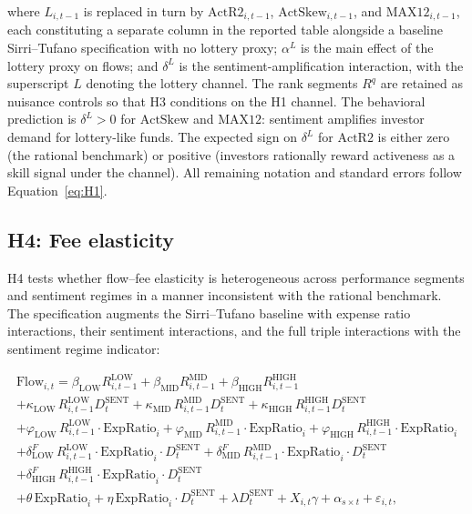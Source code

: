 \documentclass[12pt, oneside]{report}
\let\phi\varphi
\begin{document}
\noindent where $L_{i,t-1}$ is replaced in turn by
$\text{ActR2}_{i,t-1}$, $\text{ActSkew}_{i,t-1}$, and
$\text{MAX12}_{i,t-1}$, each constituting a separate column in the
reported table alongside a baseline Sirri--Tufano specification with
no lottery proxy; $\alpha^L$ is the main effect of the lottery proxy
on flows; and $\delta^L$ is the sentiment-amplification interaction,
with the superscript $L$ denoting the lottery channel. The rank
segments $R^q$ are retained as nuisance controls so that H3
conditions on the H1 channel. The behavioral prediction is
$\delta^L > 0$ for $\text{ActSkew}$ and $\text{MAX12}$: sentiment
amplifies investor demand for lottery-like funds. The expected sign
on $\delta^L$ for $\text{ActR2}$ is either zero (the rational
benchmark) or positive (investors rationally reward activeness as a
skill signal under the \textcite{AmihudGoyenko2013} channel). All
remaining notation and standard errors follow Equation~\ref{eq:H1}.

\subsection{H4: Fee elasticity}
\label{sec:H4_method}

\noindent H4 tests whether flow--fee elasticity is heterogeneous across
performance segments and sentiment regimes in a manner inconsistent
with the rational benchmark. The specification augments the
Sirri--Tufano baseline with expense ratio interactions, their
sentiment interactions, and the full triple interactions with the
sentiment regime indicator:

\begin{multline}
\text{Flow}_{i,t} =
  \beta_{\text{LOW}} R^{\text{LOW}}_{i,t-1}
+ \beta_{\text{MID}} R^{\text{MID}}_{i,t-1}
+ \beta_{\text{HIGH}} R^{\text{HIGH}}_{i,t-1} \\
+ \kappa_{\text{LOW}}\, R^{\text{LOW}}_{i,t-1} D^{\text{SENT}}_t
+ \kappa_{\text{MID}}\, R^{\text{MID}}_{i,t-1} D^{\text{SENT}}_t
+ \kappa_{\text{HIGH}}\, R^{\text{HIGH}}_{i,t-1} D^{\text{SENT}}_t \\
+ \phi_{\text{LOW}}\, R^{\text{LOW}}_{i,t-1} \cdot \text{ExpRatio}_i
+ \phi_{\text{MID}}\, R^{\text{MID}}_{i,t-1} \cdot \text{ExpRatio}_i
+ \phi_{\text{HIGH}}\, R^{\text{HIGH}}_{i,t-1} \cdot \text{ExpRatio}_i \\
+ \delta^F_{\text{LOW}}\, R^{\text{LOW}}_{i,t-1} \cdot \text{ExpRatio}_i \cdot D^{\text{SENT}}_t
+ \delta^F_{\text{MID}}\, R^{\text{MID}}_{i,t-1} \cdot \text{ExpRatio}_i \cdot D^{\text{SENT}}_t \\
+ \delta^F_{\text{HIGH}}\, R^{\text{HIGH}}_{i,t-1} \cdot \text{ExpRatio}_i \cdot D^{\text{SENT}}_t \\
+ \theta\, \text{ExpRatio}_i
+ \eta\, \text{ExpRatio}_i \cdot D^{\text{SENT}}_t
+ \lambda D^{\text{SENT}}_t
+ X_{i,t} \gamma + \alpha_{s \times t} + \varepsilon_{i,t},
\label{eq:H4}
\end{multline}
\end{document}
